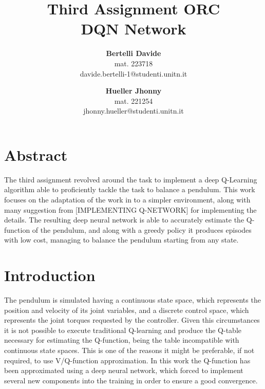 \documentclass[twocolumn, a4paper]{article}
\begin{document}
\title{
	   \LARGE\textbf{Third Assignment ORC\\DQN Network}
	   \vspace{1cm}
	  }
\author{
		\textbf{Bertelli Davide} \\
		mat. 223718 \\
		davide.bertelli-1@studenti.unitn.it
		\and
		\textbf{Hueller Jhonny} \\
		mat. 221254\\
		jhonny.hueller@studenti.unitn.it
	   }
\date{}
\maketitle

\section{Abstract}
The third assignment revolved around the task to implement a deep Q-Learning
algorithm able to proficiently tackle the task to balance a pendulum.
This work focuses on the adaptation of the work in \cite{Mnih} to a simpler
environment, along with many suggestion from [IMPLEMENTING Q-NETWORK] for
implementing the details.
The resulting deep neural network is able to accurately estimate the Q-function
of the pendulum, and along with a greedy policy it produces episodes with
low cost, managing to balance the pendulum starting from any state.

\section{Introduction}
The pendulum is simulated having a continuous state space, which represents
the position and velocity of its joint variables, and a discrete control
space, which represents the joint torques requested by the controller.
Given this circumstances it is not possible to execute traditional Q-learning
and produce the Q-table necessary for estimating the Q-function, being the table
incompatible with continuous state spaces.
This is one of the reasons it might be preferable, if not required, to use
V/Q-function approximation.
In this work the Q-function has been approximated using a deep neural network,
which forced to implement several new components into the training in order
to ensure a good convergence.
\end{document}
